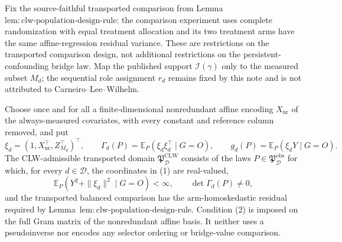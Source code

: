 Fix the source-faithful transported comparison from Lemma~\(\mathrm{lem{:}clw\text{-}population\text{-}design\text{-}rule}\): the comparison experiment uses complete randomization with equal treatment allocation and its two treatment arms have the same affine-regression residual variance.  These are restrictions on the transported comparison design, not additional restrictions on the persistent-confounding bridge law.  Map the published support \(\mathcal I(\gamma)\) only to the measured subset \(M_d\); the sequential role assignment \(r_d\) remains fixed by this note and is not attributed to Carneiro--Lee--Wilhelm.

Choose once and for all a finite-dimensional nonredundant affine encoding \(X_{\mathrm{nr}}\) of the always-measured covariates, with every constant and reference column removed, and put
\[
 \xi_d=(1,X_{\mathrm{nr}}^\top,Z_{M_d}^\top)^\top,
 \qquad
 \Gamma_d(P)=\mathbb E_P(\xi_d\xi_d^\top\mid G=O),
 \qquad
 g_d(P)=\mathbb E_P(\xi_dY\mid G=O).                       \tag{1}
\]
The CLW-admissible transported domain \(\mathfrak P_{\mathcal D}^{\mathrm{CLW}}\) consists of the laws \(P\in\mathfrak P_{\mathcal D}^{\mathrm{obs}}\) for which, for every \(d\in\mathcal D\), the coordinates in (1) are real-valued,
\[
 \mathbb E_P(Y^2+\|\xi_d\|^2\mid G=O)<\infty,
 \qquad
 \det\Gamma_d(P)\ne0,                                    \tag{2}
\]
and the transported balanced comparison has the arm-homoskedastic residual required by Lemma~\(\mathrm{lem{:}clw\text{-}population\text{-}design\text{-}rule}\).  Condition (2) is imposed on the full Gram matrix of the nonredundant affine basis.  It neither uses a pseudoinverse nor encodes any selector ordering or bridge-value comparison.

